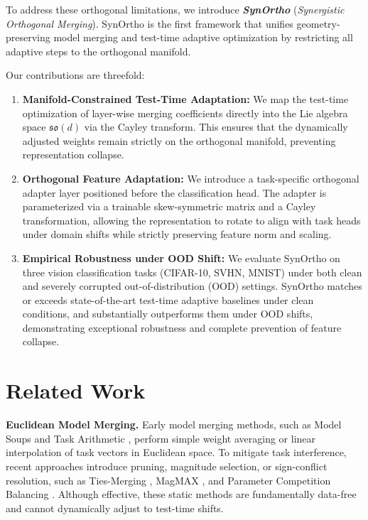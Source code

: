 \documentclass{article}
\theoremstyle{plain}
\theoremstyle{definition}
\theoremstyle{remark}
\begin{document}
To address these orthogonal limitations, we introduce \textbf{\textit{SynOrtho}} (\textit{Synergistic Orthogonal Merging}). SynOrtho is the first framework that unifies geometry-preserving model merging and test-time adaptive optimization by restricting all adaptive steps to the orthogonal manifold. 

Our contributions are threefold:
\begin{enumerate}
    \item \textbf{Manifold-Constrained Test-Time Adaptation:} We map the test-time optimization of layer-wise merging coefficients directly into the Lie algebra space $\mathfrak{so}(d)$ via the Cayley transform. This ensures that the dynamically adjusted weights remain strictly on the orthogonal manifold, preventing representation collapse.
    \item \textbf{Orthogonal Feature Adaptation:} We introduce a task-specific orthogonal adapter layer positioned before the classification head. The adapter is parameterized via a trainable skew-symmetric matrix and a Cayley transformation, allowing the representation to rotate to align with task heads under domain shifts while strictly preserving feature norm and scaling.
    \item \textbf{Empirical Robustness under OOD Shift:} We evaluate SynOrtho on three vision classification tasks (CIFAR-10, SVHN, MNIST) under both clean and severely corrupted out-of-distribution (OOD) settings. SynOrtho matches or exceeds state-of-the-art test-time adaptive baselines under clean conditions, and substantially outperforms them under OOD shifts, demonstrating exceptional robustness and complete prevention of feature collapse.
\end{enumerate}

\section{Related Work}
\label{submission-related-work}

\textbf{Euclidean Model Merging.} Early model merging methods, such as Model Soups \cite{wortsman2022model} and Task Arithmetic \cite{ilharco2023editing}, perform simple weight averaging or linear interpolation of task vectors in Euclidean space. To mitigate task interference, recent approaches introduce pruning, magnitude selection, or sign-conflict resolution, such as Ties-Merging \cite{yadav2024ties}, MagMAX \cite{marczak2025magmax}, and Parameter Competition Balancing \cite{du2024parameter}. Although effective, these static methods are fundamentally data-free and cannot dynamically adjust to test-time shifts.
\end{document}
